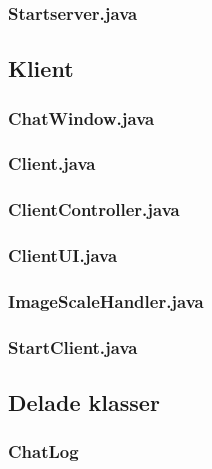 \documentclass[a4paper,11pt]{article}
\begin{document}
		\subsubsection{Startserver.java}
		
		
	\subsection{Klient}
		\subsubsection{ChatWindow.java}
		
		\subsubsection{Client.java}
		
		\subsubsection{ClientController.java}
		
		\subsubsection{ClientUI.java}
		
		\subsubsection{ImageScaleHandler.java}
		
		\subsubsection{StartClient.java}
		

	\subsection{Delade klasser}
		\subsubsection{ChatLog}
			
\end{document}
